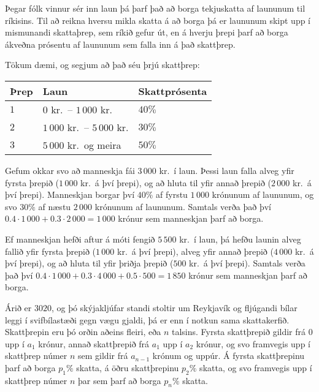 %
Þegar fólk vinnur sér inn laun þá þarf það að borga tekjuskatta af laununum til
ríkisins. Til að reikna hversu mikla skatta á að borga þá er laununum skipt upp
í mismunandi skattaþrep, sem ríkið gefur út, en á hverju þrepi þarf að borga
ákveðna prósentu af laununum sem falla inn á það skattþrep.

Tökum dæmi, og segjum að það séu þrjú skattþrep:

\begin{table}[h]
\begin{tabular}{lll}
    Þrep & Laun & Skattprósenta \\ \hline
    $1$ & $0$ kr.\ -- $1\,000$ kr. & $40\%$ \\
    $2$ & $1\,000$ kr.\ -- $5\,000$ kr. & $30\%$ \\
    $3$ & $5\,000$ kr.\ og meira & $50\%$ \\
\end{tabular}
\end{table}

Gefum okkar svo að manneskja fái $3\,000$ kr.\ í laun. Þessi laun falla alveg
yfir fyrsta þrepið ($1\,000$ kr.\ á því þrepi), og að hluta til yfir annað
þrepið ($2\,000$ kr.\ á því þrepi). Manneskjan borgar því $40\%$ af fyrstu
$1\,000$ krónunum af laununum, og svo $30\%$ af næstu $2\,000$ krónunum af
laununum. Samtals verða það því $0.4 \cdot 1\,000 + 0.3 \cdot 2\,000 = 1\,000$
krónur sem manneskjan þarf að borga.

Ef manneskjan hefði aftur á móti fengið $5\,500$ kr.\ í laun, þá hefðu launin
alveg fallið yfir fyrsta þrepið ($1\,000$ kr.\ á því þrepi), alveg yfir annað
þrepið ($4\,000$ kr.\ á því þrepi), og að hluta til yfir þriðja þrepið ($500$
kr.\ á því þrepi). Samtals verða það því $0.4\cdot 1\,000 + 0.3 \cdot 4\,000 +
0.5 \cdot 500 = 1\,850$ krónur sem manneskjan þarf að borga.

Árið er $3020$, og þó skýjakljúfar standi stoltir um Reykjavík og fljúgandi
bílar leggi í svifbílastæði gegn vægu gjaldi, þá er enn í notkun sama
skattakerfið. Skattþrepin eru þó orðin aðeins fleiri, eða $n$ talsins. Fyrsta
skattþrepið gildir frá $0$ upp í $a_1$ krónur, annað skattþrepið frá $a_1$ upp
í $a_2$ krónur, og svo framvegis upp í skattþrep númer $n$ sem gildir frá $a_{n-1}$
krónum og uppúr. Á fyrsta skattþrepinu þarf að borga $p_1\%$ skatta, á öðru
skattþrepinu $p_2\%$ skatta, og svo framvegis upp í skattþrep númer $n$ þar sem
þarf að borga $p_n\%$ skatta.

